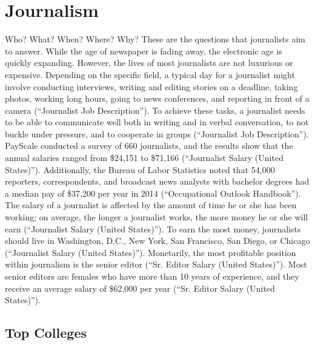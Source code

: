 \chapter{Journalism}
\begin{multicols}{2}

Who? What? When? Where? Why? These are the questions that journalists aim to answer. While the age of newspaper is fading away, the electronic age is quickly expanding. However, the lives of most journalists are not luxurious or expensive. Depending on the specific field, a typical day for a journalist might involve conducting interviews, writing and editing stories on a deadline, taking photos, working long hours, going to news conferences, and reporting in front of a camera (“Journalist Job Description”). To achieve these tasks, a journalist needs to be able to communicate well both in writing and in verbal conversation, to not buckle under pressure, and to cooperate in groups (“Journalist Job Description”). PayScale conducted a survey of 660 journalists, and the results show that the annual salaries ranged from \$24,151 to \$71,166 (“Journalist Salary (United States)”). Additionally, the Bureau of Labor Statistics noted that 54,000 reporters, correspondents, and broadcast news analysts with bachelor degrees had a median pay of \$37,200 per year in 2014 (“Occupational Outlook Handbook”). The salary of a journalist is affected by the amount of time he or she has been working; on average, the longer a journalist works, the more money he or she will earn (“Journalist Salary (United States)”). To earn the most money, journalists should live in Washington, D.C., New York, San Francisco, San Diego, or Chicago (“Journalist Salary (United States)”). Monetarily, the most profitable position within journalism is the senior editor (“Sr. Editor Salary (United States)”). Most senior editors are females who have more than 10 years of experience, and they receive an average salary of \$62,000 per year (“Sr. Editor Salary (United States)”).  

\end{multicols}

\section{Top Colleges}

